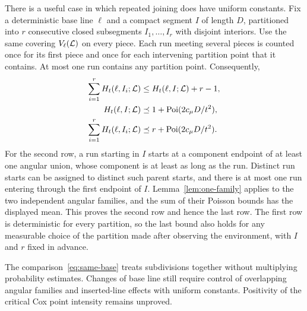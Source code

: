 \documentclass[11pt,letterpaper]{article}
\begin{document}
There is a useful case in which repeated joining does have uniform constants. Fix a deterministic base line $\ell$ and a compact segment $I$ of length $D$, partitioned into $r$ consecutive closed subsegments $I_1,\ldots,I_r$ with disjoint interiors. Use the same covering $V_\ell(\mathcal L)$ on every piece. Each run meeting several pieces is counted once for its first piece and once for each intervening partition point that it contains. At most one run contains any partition point. Consequently,
\begin{equation}\label{eq:same-base}
\begin{aligned}
 \sum_{i=1}^r H_t(\ell,I_i;\mathcal L)&\le H_t(\ell,I;\mathcal L)+r-1,\\
 H_t(\ell,I;\mathcal L)&\preceq1+\operatorname{Poi}(2c_\mu D/t^2),\\
 \sum_{i=1}^r H_t(\ell,I_i;\mathcal L)&\preceq r+\operatorname{Poi}(2c_\mu D/t^2).
\end{aligned}
\end{equation}
For the second row, a run starting in $I$ starts at a component endpoint of at least one angular union, whose component is at least as long as the run. Distinct run starts can be assigned to distinct such parent starts, and there is at most one run entering through the first endpoint of $I$. Lemma~\ref{lem:one-family} applies to the two independent angular families, and the sum of their Poisson bounds has the displayed mean. This proves the second row and hence the last row. The first row is deterministic for every partition, so the last bound also holds for any measurable choice of the partition made after observing the environment, with $I$ and $r$ fixed in advance.

The comparison~\eqref{eq:same-base} treats subdivisions together without multiplying probability estimates. Changes of base line still require control of overlapping angular families and inserted-line effects with uniform constants. Positivity of the critical Cox point intensity remains unproved.



\end{document}
